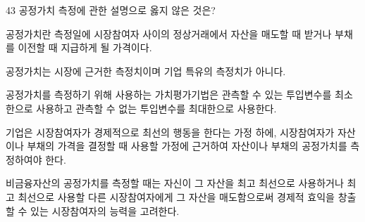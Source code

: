 \begin{question}{43}
공정가치 측정에 관한 설명으로 옳지 않은 것은?
\begin{choices}
  \item 공정가치란 측정일에 시장참여자 사이의 정상거래에서 자산을 매도할 때 받거나 부채를 이전할 때 지급하게 될 가격이다.
  \item 공정가치는 시장에 근거한 측정치이며 기업 특유의 측정치가 아니다.
  \item 공정가치를 측정하기 위해 사용하는 가치평가기법은 관측할 수 있는 투입변수를 최소한으로 사용하고 관측할 수 없는 투입변수를 최대한으로 사용한다.
  \item 기업은 시장참여자가 경제적으로 최선의 행동을 한다는 가정 하에, 시장참여자가 자산이나 부채의 가격을 결정할 때 사용할 가정에 근거하여 자산이나 부채의 공정가치를 측정하여야 한다.
  \item 비금융자산의 공정가치를 측정할 때는 자신이 그 자산을 최고 최선으로 사용하거나 최고 최선으로 사용할 다른 시장참여자에게 그 자산을 매도함으로써 경제적 효익을 창출할 수 있는 시장참여자의 능력을 고려한다.
\end{choices}
\end{question}
